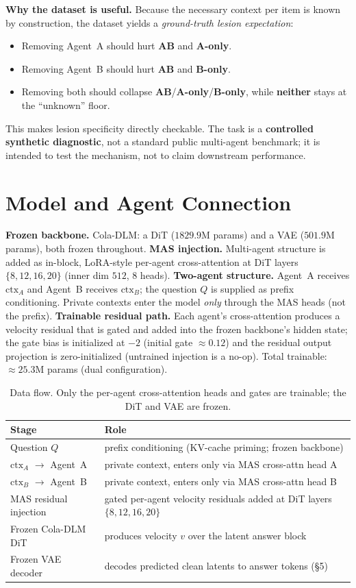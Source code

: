 \documentclass[10pt]{article}
\newcommand{\ctxa}{$\text{ctx}_A$}
\newcommand{\ctxb}{$\text{ctx}_B$}
\begin{document}
\noindent\textbf{Why the dataset is useful.} Because the necessary context per item is known
by construction, the dataset yields a \emph{ground-truth lesion expectation}:
\begin{itemize}
\item Removing Agent~A should hurt \textbf{AB} and \textbf{A-only}.
\item Removing Agent~B should hurt \textbf{AB} and \textbf{B-only}.
\item Removing both should collapse \textbf{AB}/\textbf{A-only}/\textbf{B-only}, while
\textbf{neither} stays at the ``unknown'' floor.
\end{itemize}
This makes lesion specificity directly checkable. The task is a \textbf{controlled
synthetic diagnostic}, not a standard public multi-agent benchmark; it is intended to test
the mechanism, not to claim downstream performance.

\section{Model and Agent Connection}
\textbf{Frozen backbone.} Cola-DLM: a DiT ($1829.9$M params) and a VAE ($501.9$M params),
both frozen throughout. \textbf{MAS injection.} Multi-agent structure is added as in-block,
LoRA-style per-agent cross-attention at DiT layers $\{8,12,16,20\}$ (inner dim $512$,
$8$ heads). \textbf{Two-agent structure.} Agent~A receives \ctxa{} and Agent~B receives
\ctxb{}; the question $Q$ is supplied as prefix conditioning. Private contexts enter the
model \emph{only} through the MAS heads (not the prefix). \textbf{Trainable residual path.}
Each agent's cross-attention produces a velocity residual that is gated and added into the
frozen backbone's hidden state; the gate bias is initialized at $-2$ (initial gate
${\approx}0.12$) and the residual output projection is zero-initialized (untrained
injection is a no-op). Total trainable: ${\approx}25.3$M params (dual configuration).

\begin{table}[H]
\centering
\small
\begin{tabular}{@{}l l@{}}
\toprule
\textbf{Stage} & \textbf{Role} \\
\midrule
Question $Q$              & prefix conditioning (KV-cache priming; frozen backbone) \\
\ctxa{} $\rightarrow$ Agent~A & private context, enters only via MAS cross-attn head A \\
\ctxb{} $\rightarrow$ Agent~B & private context, enters only via MAS cross-attn head B \\
MAS residual injection    & gated per-agent velocity residuals added at DiT layers $\{8,12,16,20\}$ \\
Frozen Cola-DLM DiT        & produces velocity $v$ over the latent answer block \\
Frozen VAE decoder         & decodes predicted clean latents to answer tokens (\S5) \\
\bottomrule
\end{tabular}
\caption{Data flow. Only the per-agent cross-attention heads and gates are trainable; the
DiT and VAE are frozen.}
\end{table}
\end{document}
